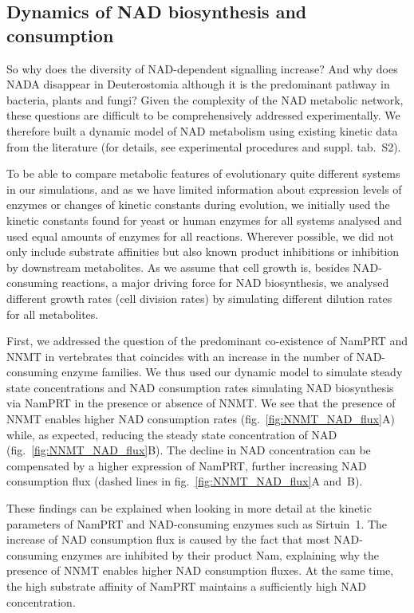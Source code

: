 \subsection{Dynamics of NAD biosynthesis and consumption}

So why does the diversity of NAD-dependent signalling increase? And why does NADA disappear in Deuterostomia although it is the predominant pathway in bacteria, plants and fungi? Given the complexity of the NAD metabolic network, these questions are difficult to be comprehensively addressed experimentally. We therefore built a dynamic model of NAD metabolism using existing kinetic data from the literature (for details, see experimental procedures and suppl. tab.~S2).

To be able to compare metabolic features of evolutionary quite different systems in our simulations, and as we have limited information about expression levels of enzymes or changes of kinetic constants during evolution, we initially used the kinetic constants found for yeast or human enzymes for all systems analysed and used equal amounts of enzymes for all reactions. Wherever possible, we did not only include substrate affinities but also known product inhibitions or inhibition by downstream metabolites. As we assume that cell growth is, besides NAD-consuming reactions, a major driving force for NAD biosynthesis, we analysed different growth rates (cell division rates) by simulating different dilution rates for all metabolites.

First, we addressed the question of the predominant co-existence of NamPRT and NNMT in vertebrates that coincides with an increase in the number of NAD-consuming enzyme families. We thus used our dynamic model to simulate steady state concentrations and NAD consumption rates simulating NAD biosynthesis via NamPRT in the presence or absence of NNMT. We see that the presence of NNMT enables higher NAD consumption rates (fig.~\ref{fig:NNMT_NAD_flux}A) while, as expected, reducing the steady state concentration of NAD (fig.~\ref{fig:NNMT_NAD_flux}B). The decline in NAD concentration can be compensated by a higher expression of NamPRT, further increasing NAD consumption flux (dashed lines in fig.~\ref{fig:NNMT_NAD_flux}A and~B).

These findings can be explained when looking in more detail at the kinetic parameters of NamPRT and NAD-consuming enzymes such as Sirtuin~1. The increase of NAD consumption flux is caused by the fact that most NAD-consuming enzymes are inhibited by their product Nam, explaining why the presence of NNMT enables higher NAD consumption fluxes. At the same time, the high substrate affinity of NamPRT maintains a sufficiently high NAD concentration.

